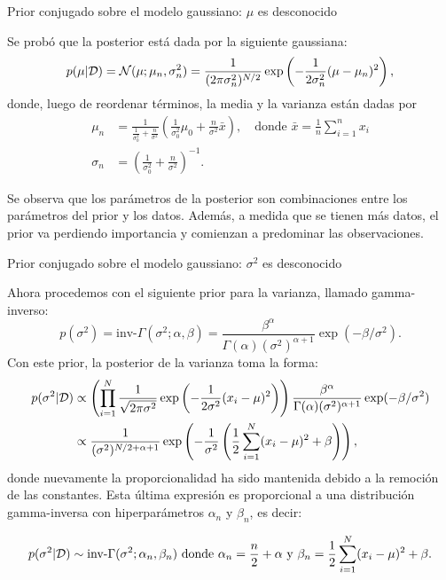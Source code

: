 \documentclass[9pt, handout]{beamer}
\begin{document}
\begin{frame}{Prior conjugado sobre el modelo gaussiano: $\mu$ es desconocido}

Se probó que la posterior está dada por la siguiente gaussiana:
  \begin{equation*}
 	p(\mu|{\mathcal D}) = {\mathcal N}(\mu;\mu_n,\sigma_n^2) = \frac{1}{(2\pi\sigma_n^2)^{N/2}}\exp\left(-\frac{1}{2\sigma_n^2}(\mu - \mu_n)^2\right),
 \end{equation*} 
 donde, luego de reordenar términos, la media y la varianza están dadas por 
 \begin{align*}
 	\mu_n &= \frac{1}{\tfrac{1}{\sigma_0^2} + \tfrac{n}{\sigma^2}} \left(\frac{1}{\sigma_0^2}\mu_0 + \frac{n}{\sigma^2}\bar{x} \right), \quad \text{donde } \bar{x} = \frac{1}{n}\sum_{i=1}^n x_i\label{eq:post_Gm}\\
 	\sigma_n &= \left(\frac{1}{\sigma_0^2} + \frac{n}{\sigma^2}\right)^{-1}.
 \end{align*}\pause

Se observa que los parámetros de la posterior son combinaciones entre los parámetros del prior y los datos. Además, a medida que se tienen más datos, el prior va perdiendo importancia y comienzan a predominar las observaciones.
	
\end{frame}

\begin{frame}{Prior conjugado sobre el modelo gaussiano: $\sigma^2$ es desconocido}

Ahora procedemos con el siguiente prior para la varianza, llamado gamma-inverso:
 \begin{equation*}
 	p(\sigma^2)= \text{inv-}\Gamma(\sigma^2;\alpha,\beta) = \frac{\beta^\alpha}{\Gamma(\alpha) (\sigma^2)^{\alpha+1}}\exp(-\beta/\sigma^2).
 \end{equation*}\pause
Con este prior, la posterior de la varianza toma la forma:
 \begin{align*}
 	p(\sigma^2|{\mathcal D}) &\propto \left(\prod_{i=1}^N \frac{1}{\sqrt{2\pi\sigma^2}}\exp\left(-\frac{1}{2\sigma^2}(x_i-\mu)^2\right)\right) \frac{\beta^\alpha}{\Gamma(\alpha) (\sigma^2)^{\alpha+1}}\exp(-\beta/\sigma^2)\\
 	&\propto  \frac{1}{(\sigma^2)^{N/2+\alpha+1}}\exp\left(-\frac{1}{\sigma^2}\left(\frac{1}{2}\sum_{i=1}^N(x_i-\mu)^2 +\beta\right) \right),\nonumber
 \end{align*} 
 donde nuevamente la proporcionalidad ha sido mantenida debido a la remoción de las constantes. \pause Esta última expresión es proporcional a una distribución gamma-inversa con hiperparámetros $\alpha_n$ y $\beta_n$, es decir:
 
 \begin{equation*}
 	p(\sigma^2|{\mathcal D}) \sim \text{inv-}\Gamma(\sigma^2;\alpha_n,\beta_n) \text{ donde } \alpha_n = \frac{n}{2}+\alpha \text{ y } \beta_n = \frac{1}{2}\sum_{i=1}^N(x_i-\mu)^2 +\beta.
 \end{equation*}
	
\end{frame}
\end{document}

